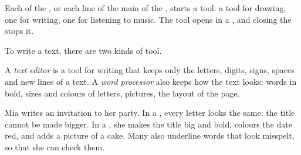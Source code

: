 Each  of the , or each line of the main  of the ,
starts a tool: a tool for drawing, one for writing, one for listening to
music. The tool opens in a , and closing the  stops it.

To write a text, there are two kinds of tool.

\begin{definition}\label{def:g2:using-a-computer:word-processor}
A \emph{text editor} is a tool for writing that keeps only
the letters, digits, signs, spaces and new lines of a text. A \emph{word
processor} also keeps how the text looks: words in bold,
sizes and colours of letters, pictures, the layout of the page.
\end{definition}

\begin{example}\label{ex:g2:using-a-computer:note}
Mia writes an invitation to her party. In a , every letter looks
the same: the title cannot be made bigger. In a , she makes the
title big and bold, colours the date red, and adds a picture of a cake. Many
 also underline words that look misspelt, so that she can
check them.
\end{example}

